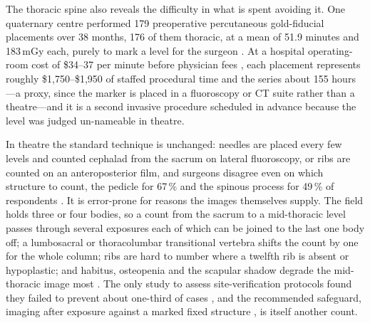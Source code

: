 \documentclass[11pt,letterpaper]{article}
\begin{document}
The thoracic spine also reveals the difficulty in what is spent avoiding it. One quaternary centre performed
179 preoperative percutaneous gold-fiducial placements over 38 months, 176 of them thoracic, at a mean of
51.9 minutes and 183\,mGy each, purely to mark a level for the surgeon \citep{siminski2023}. At a hospital
operating-room cost of \$34--37 per minute before physician fees \citep{childers2018}, each placement
represents roughly \$1,750--\$1,950 of staffed procedural time and the series about 155 hours---a proxy,
since the marker is placed in a fluoroscopy or CT suite rather than a theatre---and it is a second invasive
procedure scheduled in advance because the level was judged un-nameable in theatre.

In theatre the standard technique is unchanged: needles are placed every few levels and counted cephalad
from the sacrum on lateral fluoroscopy, or ribs are counted on an anteroposterior film, and surgeons disagree
even on which structure to count, the pedicle for 67\,\% and the spinous process for 49\,\% of respondents
\citep{strong2021,mayer2008}. It is error-prone for reasons the images themselves supply. The field holds
three or four bodies, so a count from the sacrum to a mid-thoracic level passes through several exposures
each of which can be joined to the last one body off; a lumbosacral or thoracolumbar transitional vertebra
shifts the count by one for the whole column; ribs are hard to number where a twelfth rib is absent or
hypoplastic; and habitus, osteopenia and the scapular shadow degrade the mid-thoracic image most
\citep{strong2021,hsiang2011}. The only study to assess site-verification protocols found they failed to
prevent about one-third of cases \citep{longo2012}, and the recommended safeguard, imaging after exposure
against a marked fixed structure \citep{devine2010}, is itself another count.
\end{document}
